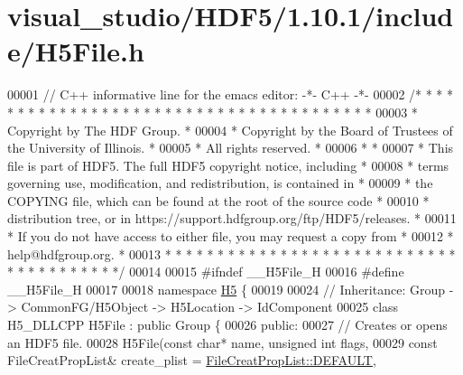 \hypertarget{visual__studio_2_h_d_f5_21_810_81_2include_2_h5_file_8h_source}{}\section{visual\+\_\+studio/\+H\+D\+F5/1.10.1/include/\+H5\+File.h}
\label{visual__studio_2_h_d_f5_21_810_81_2include_2_h5_file_8h_source}

\begin{DoxyCode}
00001 \textcolor{comment}{// C++ informative line for the emacs editor: -*- C++ -*-}
00002 \textcolor{comment}{/* * * * * * * * * * * * * * * * * * * * * * * * * * * * * * * * * * * * * * *}
00003 \textcolor{comment}{ * Copyright by The HDF Group.                                               *}
00004 \textcolor{comment}{ * Copyright by the Board of Trustees of the University of Illinois.         *}
00005 \textcolor{comment}{ * All rights reserved.                                                      *}
00006 \textcolor{comment}{ *                                                                           *}
00007 \textcolor{comment}{ * This file is part of HDF5.  The full HDF5 copyright notice, including     *}
00008 \textcolor{comment}{ * terms governing use, modification, and redistribution, is contained in    *}
00009 \textcolor{comment}{ * the COPYING file, which can be found at the root of the source code       *}
00010 \textcolor{comment}{ * distribution tree, or in https://support.hdfgroup.org/ftp/HDF5/releases.  *}
00011 \textcolor{comment}{ * If you do not have access to either file, you may request a copy from     *}
00012 \textcolor{comment}{ * help@hdfgroup.org.                                                        *}
00013 \textcolor{comment}{ * * * * * * * * * * * * * * * * * * * * * * * * * * * * * * * * * * * * * * */}
00014 
00015 \textcolor{preprocessor}{#ifndef \_\_H5File\_H}
00016 \textcolor{preprocessor}{#define \_\_H5File\_H}
00017 
00018 \textcolor{keyword}{namespace }\hyperlink{namespace_h5}{H5} \{
00019 
00024 \textcolor{comment}{//  Inheritance: Group -> CommonFG/H5Object -> H5Location -> IdComponent}
00025 \textcolor{keyword}{class }H5\_DLLCPP H5File : \textcolor{keyword}{public} Group \{
00026    \textcolor{keyword}{public}:
00027         \textcolor{comment}{// Creates or opens an HDF5 file.}
00028         H5File(\textcolor{keyword}{const} \textcolor{keywordtype}{char}* name, \textcolor{keywordtype}{unsigned} \textcolor{keywordtype}{int} flags,
00029            \textcolor{keyword}{const} FileCreatPropList& create\_plist = \hyperlink{class_h5_1_1_file_creat_prop_list_a4913710830a8ec38fbbda805074377d4}{FileCreatPropList::DEFAULT},

\end{DoxyCode}
